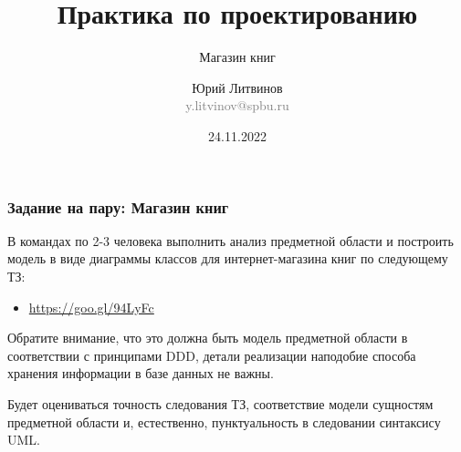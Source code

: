 \documentclass[xetex,mathserif,serif]{beamer}
\title{Практика по проектированию}
\subtitle{Магазин книг}
\author[Юрий Литвинов]{Юрий Литвинов\\\small{\textcolor{gray}{y.litvinov@spbu.ru}}}
\date{24.11.2022}
\begin{document}
	
	\frame{\titlepage}

	\begin{frame}
		\frametitle{Задание на пару: Магазин книг}
		В командах по 2-3 человека выполнить анализ предметной области и построить модель в виде диаграммы классов для интернет-магазина книг по следующему ТЗ:
		\begin{itemize}
			\item \url{https://goo.gl/94LyFc}
		\end{itemize}

		Обратите внимание, что это должна быть модель предметной области в соответствии с принципами DDD, детали реализации наподобие способа хранения информации в базе данных не важны.

		Будет оцениваться точность следования ТЗ, соответствие модели сущностям предметной области и, естественно, пунктуальность в следовании синтаксису UML.
	\end{frame}
\end{document}

